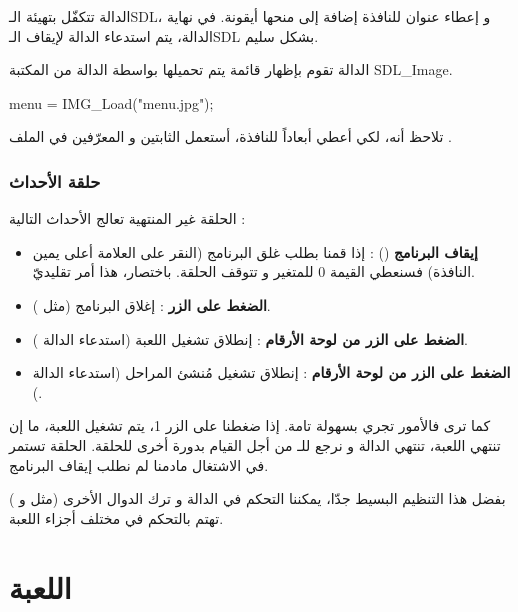 الدالة
تتكفّل بتهيئة الـ\textenglish{SDL}،
و إعطاء عنوان للنافذة إضافة إلى منحها أيقونة. في نهاية الدالة، يتم استدعاء الدالة 
 لإيقاف الـ\textenglish{SDL}
بشكل سليم.

الدالة تقوم بإظهار قائمة يتم تحميلها بواسطة الدالة 
من المكتبة
\textenglish{SDL\_Image}.

\begin{Csource}
menu = IMG_Load("menu.jpg");
\end{Csource}

تلاحظ أنه، لكي أعطي أبعاداً للنافذة، أستعمل الثابتين
و
المعرّفين في الملف
.

\subsubsection{حلقة الأحداث}

الحلقة غير المنتهية تعالج الأحداث التالية :

\begin{itemize}
	\item \textbf{إيقاف البرنامج}
	() :
	إذا قمنا بطلب غلق البرنامج (النقر على العلامة
	أعلى يمين النافذة) فسنعطي القيمة 0 للمتغير
	و تتوقف الحلقة. باختصار، هذا أمر تقليديّ.
	\item \textbf{الضغط على الزر
		} :
	إغلاق البرنامج (مثل
	).
	\item \textbf{الضغط على الزر
	من لوحة الأرقام} :
	إنطلاق تشغيل اللعبة (استدعاء الدالة 
	).
	\item \textbf{الضغط على الزر
	من لوحة الأرقام} :
	إنطلاق تشغيل مُنشئ المراحل (استدعاء الدالة
	).
\end{itemize}

كما ترى فالأمور تجري بسهولة تامة. إذا ضغطنا على الزر 1، يتم تشغيل اللعبة، ما إن تنتهي اللعبة، تنتهي الدالة
و نرجع للـ
من أجل القيام بدورة أخرى للحلقة. الحلقة تستمر في الاشتغال مادمنا لم نطلب إيقاف البرنامج.

بفضل هذا التنظيم البسيط جدّا، يمكننا التحكم في الدالة
و ترك الدوال الأخرى (مثل
و
)
تهتم بالتحكم في مختلف أجزاء اللعبة.

\section{اللعبة}

